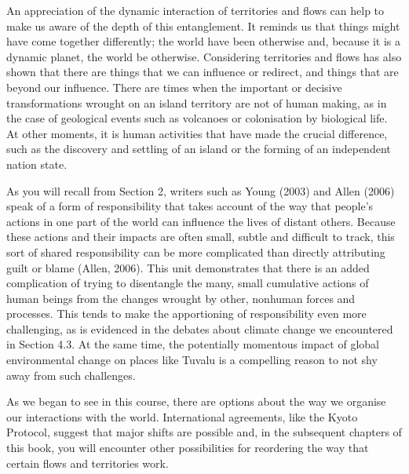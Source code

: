 \documentclass[letterpaper,10pt,english]{sphinxmanual}
\begin{document}
An appreciation of the dynamic interaction of territories and flows can help to make us aware of the depth of this entanglement. It reminds us that things might have come together differently; the world  have been otherwise and, because it is a dynamic planet, the world  be otherwise. Considering territories and flows has also shown that there are things that we can influence or redirect, and things that are beyond our influence. There are times when the important or decisive
transformations wrought on an island territory are not of human making, as in the case of geological events such as volcanoes or colonisation by biological life. At other moments, it is human activities that have made the crucial difference, such as the discovery and settling of an island or the forming of an independent nation state.

As you will recall from Section 2, writers such as Young (2003) and Allen (2006) speak of a form of responsibility that takes account of the way that people’s actions in one part of the world can influence the lives of distant others. Because these actions and their impacts are often small, subtle and difficult to track, this sort of shared responsibility can be more complicated than directly attributing guilt or blame (Allen, 2006). This unit demonstrates that there is an added complication of
trying to disentangle the many, small cumulative actions of human beings from the changes wrought by other, non\sphinxhyphen{}human forces and processes. This tends to make the apportioning of responsibility even more challenging, as is evidenced in the debates about climate change we encountered in Section 4.3. At the same time, the potentially momentous impact of global environmental change on places like Tuvalu is a compelling reason to not shy away from such challenges.

As we began to see in this course, there are options about the way we organise our interactions with the world. International agreements, like the Kyoto Protocol, suggest that major shifts are possible and, in the subsequent chapters of this book, you will encounter other possibilities for reordering the way that certain flows and territories work.



\renewcommand{\indexname}{Index}
\printindex
\end{document}
